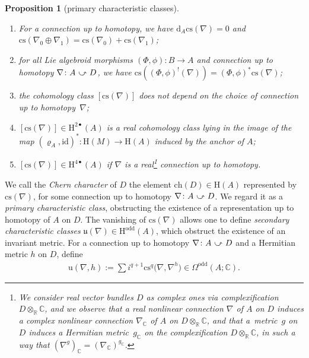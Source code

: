 \documentclass[11pt]{article}
\numberwithin{equation}{section}
\newcommand{\R}{\mathbb{R}}
\newcommand{\homo}{ \ \raisebox{\depth}{\scalebox{1}[-1]{$\curvearrowright$}} \ }
\newcommand{\C}{\mathbb{C}}
\newcommand{\dd}{\mathrm{d}}
\newcommand{\HH}{\mathrm{H}}
\newcommand{\id}{\mathrm{id}}
\newcommand{\8}{\infty}
\newtheorem{proposition}{Proposition}
\begin{document}
\begin{proposition}[primary characteristic classes]\label{pro : primary}\quad
 \begin{enumerate}\itemsep=0pt
 \item[$a)$] For a connection up to homotopy, we have $\dd_A\mathrm{cs}(\nabla) = 0$ and $\mathrm{cs}(\nabla_0 \oplus \nabla_1)=\mathrm{cs}(\nabla_0)+\mathrm{cs}(\nabla_1)$;
 \item[$b)$] for all Lie algebroid morphisms $(\Phi,\phi)\colon B \to A$ and connection up to homotopy $\nabla\colon A \homo D$, we have $\mathrm{cs}((\Phi,\phi)^!(\nabla)) = (\Phi,\phi)^*\mathrm{cs}(\nabla)$;
 \item[$c)$] the cohomology class $[\mathrm{cs}(\nabla)]$ does not depend on the choice of connection up to homotopy~$\nabla$;
 \item[$d)$] $[\mathrm{cs}(\nabla)] \!\in\! \mathrm{H}^{2\bullet}(A)$ is a real cohomology class lying in the image of the map $(\varrho_A,\id)^*\colon \HH(M) \!\to\! \HH(A)$ induced by the anchor of $A$;
 \item[$e)$] $[\mathrm{cs}(\nabla)] \in \mathrm{H}^{4\bullet}(A)$ if $\nabla$ is a real\footnote{We consider real vector bundles $D$ as complex ones via complexification $D \otimes_{\R}\C$, and we observe that a real nonlinear connection $\nabla$ of $A$ on $D$ induces a complex nonlinear connection $\nabla_{\C}$ of $A$ on $D \otimes_{\R}\C$, and that a~metric~$g$ on $D$ induces a Hermitian metric~$g_{\C}$ on the complexification $D \otimes_{\R}\C$, in such a way that $(\nabla^g)_{\C} = (\nabla_{\C})^{g_{\C}}$.} connection up to homotopy.
 \end{enumerate}
\end{proposition}

We call the {\it Chern character} of $D$ the element $\mathrm{ch}(D) \in \mathrm{H}(A)$ represented by $\mathrm{cs}(\nabla)$, for some connection up to homotopy $\nabla\colon A \homo D$. We regard it as a {\it primary characteristic class}, obstructing the existence of a representation up to homotopy of $A$ on $D$. The vanishing of $\mathrm{cs}(\nabla)$ allows one to define {\it secondary characteristic classes} $\mathfrak{u}(\nabla) \in \mathrm{H}^{\mathrm{odd}}(A)$, which obstruct the existence of an invariant metric. For a connection up to homotopy $\nabla\colon A \homo D$ and a Hermitian metric $h$ on $D$, define
\begin{gather*}
 \mathrm{u}(\nabla,h):= \sum i^{q+1}\mathrm{cs}^q\big(\nabla,\nabla^h\big) \in \Omega^{\mathrm{odd}}(A;\C).
\end{gather*}
\end{document}
